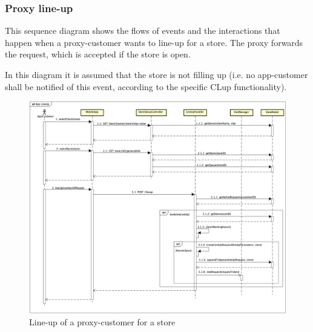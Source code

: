 \documentclass[a4paper,oneside,11pt]{book}
\begin{document}
    \subsubsection{Proxy line-up}
    This sequence diagram shows the flows of events and the interactions that happen when a proxy-customer wants to line-up for a store. The proxy forwards the request, which is accepted if the store is open. \par
    In this diagram it is assumed that the store is not filling up (i.e. no app-customer shall be notified of this event, according to the specific CLup functionality).
    \begin{figure}[H]
        \centering
        \includegraphics[width=\textwidth, height=\textheight, keepaspectratio]{pictures/sequence_diagrams/app_lineup}
        \caption{Line-up of a proxy-customer for a store}
        \label{figure:app_lineup}
    \end{figure}
    \newpage
\end{document}
